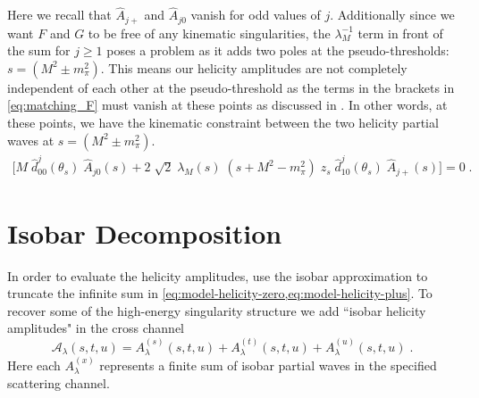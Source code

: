 \documentclass[10pt, aps,prd,amsmath,amssymb,superscriptaddress,onecolumn,
nofootinbib,showpacs,preprintnumbers]{revtex4-1}
\begin{document}
 Here we recall that \(\hat{A}_{j+}\) and \(\hat{A}_{j0}\) vanish for odd values of \(j\). Additionally since we want \(F\) and \(G\) to be free of any kinematic singularities, the \(\lambda_M^{-1}\) term in front of the sum for \(j\geq 1\) poses a problem as it adds two poles at the pseudo-thresholds: \(s = (M^2 \pm m_\pi^2)\).
 This means our helicity amplitudes are not completely independent of each other at the pseudo-threshold as the terms in the brackets in \cref{eq:matching_F} must vanish at these points as discussed in \cite{Mikhasenko:2017rkh}. In other words, at these points, we have the kinematic constraint between the two helicity partial waves at \(s = (M^2 \pm m_\pi^2)\).
 \begin{align}
  \bigg[ M \; \hat{d}_{00}^j(\theta_s) \; \hat{A}_{j0}(s) + 2 \; \sqrt{2} \; \lambda_M(s) \; (s+ M^2 - m_\pi^2) \; z_s \; \hat{d}^j_{10}(\theta_s) \; \hat{A}_{j+}(s) \bigg] = 0 \; .
 \end{align}
\section{Isobar Decomposition} \label{sec:isobar-decomp}
In order to evaluate the helicity amplitudes, use the isobar approximation to truncate the infinite sum in \cref{eq:model-helicity-zero,eq:model-helicity-plus}. To recover some of the high-energy singularity structure we add ``isobar helicity amplitudes" in the cross channel
  \begin{equation}
    \label{eq:isobar-def}
    \mathcal{A}_\lambda(s,t,u) = A_\lambda^{(s)}(s,t,u) +  A_\lambda^{(t)}(s,t,u) + A_\lambda^{(u)}(s,t,u) \; .
  \end{equation}
Here each \(A_\lambda^{(x)}\) represents a finite sum of isobar partial waves in the specified scattering channel.
\end{document}
